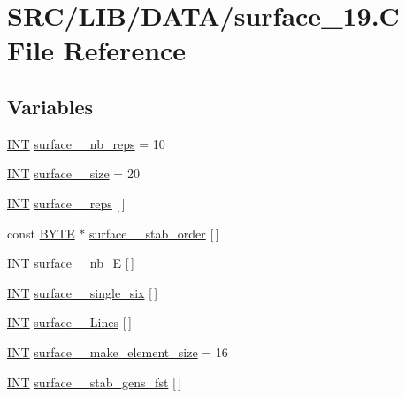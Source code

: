 \hypertarget{surface__19_8_c}{}\section{S\+R\+C/\+L\+I\+B/\+D\+A\+T\+A/surface\+\_\+19.C File Reference}
\label{surface__19_8_c}
\subsection*{Variables}
\begin{DoxyCompactItemize}
\item 
\mbox{\hyperlink{galois_8h_a09fddde158a3a20bd2dcadb609de11dc}{I\+NT}} \mbox{\hyperlink{surface__19_8_c_af2e4e9f438b21dd7bafdc3ac7ab727d3}{surface\+\_\+\_\+nb\+\_\+reps}} = 10
\item 
\mbox{\hyperlink{galois_8h_a09fddde158a3a20bd2dcadb609de11dc}{I\+NT}} \mbox{\hyperlink{surface__19_8_c_a335fb0dec144b06b0685783f72171abd}{surface\+\_\+\_\+size}} = 20
\item 
\mbox{\hyperlink{galois_8h_a09fddde158a3a20bd2dcadb609de11dc}{I\+NT}} \mbox{\hyperlink{surface__19_8_c_ac70892531bbb10a39fde222b866f9548}{surface\+\_\+\_\+reps}} \mbox{[}$\,$\mbox{]}
\item 
const \mbox{\hyperlink{galois_8h_ab6cc7b4aeb6ea31aba2b3fbfc83ff5e6}{B\+Y\+TE}} $\ast$ \mbox{\hyperlink{surface__19_8_c_a0b7917f15a610ca524da362b484ddce3}{surface\+\_\+\_\+stab\+\_\+order}} \mbox{[}$\,$\mbox{]}
\item 
\mbox{\hyperlink{galois_8h_a09fddde158a3a20bd2dcadb609de11dc}{I\+NT}} \mbox{\hyperlink{surface__19_8_c_a625a87904ef7cd12e44223b3150f7b52}{surface\+\_\+\_\+nb\+\_\+E}} \mbox{[}$\,$\mbox{]}
\item 
\mbox{\hyperlink{galois_8h_a09fddde158a3a20bd2dcadb609de11dc}{I\+NT}} \mbox{\hyperlink{surface__19_8_c_a4b5da5f3555724184f46be87dde8bc46}{surface\+\_\+\_\+single\+\_\+six}} \mbox{[}$\,$\mbox{]}
\item 
\mbox{\hyperlink{galois_8h_a09fddde158a3a20bd2dcadb609de11dc}{I\+NT}} \mbox{\hyperlink{surface__19_8_c_a88cde5b30ab7a251c865a924dad7ec13}{surface\+\_\+\_\+\+Lines}} \mbox{[}$\,$\mbox{]}
\item 
\mbox{\hyperlink{galois_8h_a09fddde158a3a20bd2dcadb609de11dc}{I\+NT}} \mbox{\hyperlink{surface__19_8_c_a1918fec16222a683deeff40744f3d5a4}{surface\+\_\+\_\+make\+\_\+element\+\_\+size}} = 16
\item 
\mbox{\hyperlink{galois_8h_a09fddde158a3a20bd2dcadb609de11dc}{I\+NT}} \mbox{\hyperlink{surface__19_8_c_a3ffe68c11942085c0e299e1ce8f2fc55}{surface\+\_\+\_\+stab\+\_\+gens\+\_\+fst}} \mbox{[}$\,$\mbox{]}

\end{DoxyCompactItemize}
